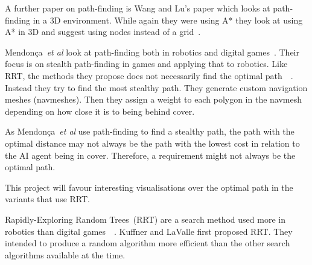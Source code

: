 \documentclass[journal]{IEEEtran}
\begin{document}
A further paper on path-finding is Wang and Lu's paper which looks at path-finding in a 3D environment. While again they were using A* they look at using A* in 3D and suggest using nodes instead of a grid~\cite{wang2012}.

Mendonça~\textit{et al} look at path-finding both in robotics and digital games~\cite{Mendonça2015}. Their focus is on stealth path-finding in games and applying that to robotics. Like RRT, the methods they propose does not necessarily find the optimal path~\cite{karaman2010}~\cite{Mendonça2015}. Instead they try to find the most stealthy path. They generate custom navigation meshes (navmeshes). Then they assign a weight to each polygon in the navmesh depending on how close it is to being behind cover. 

As Mendonça~\textit{et al} use path-finding to find a stealthy path, the path with the optimal distance may not always be the path with the lowest cost in relation to the AI agent being in cover. Therefore, a requirement might not always be the optimal path. 

This project will favour interesting visualisations over the optimal path in the variants that use RRT. 


Rapidly-Exploring Random Trees~(RRT) are a search method used more in robotics than digital games~\cite{LaValle1998}~\cite{Kuffner2000}.   Kuffner and LaValle first proposed RRT. They intended to produce a random algorithm more efficient than the other search algorithms available at the time. 
\end{document}

